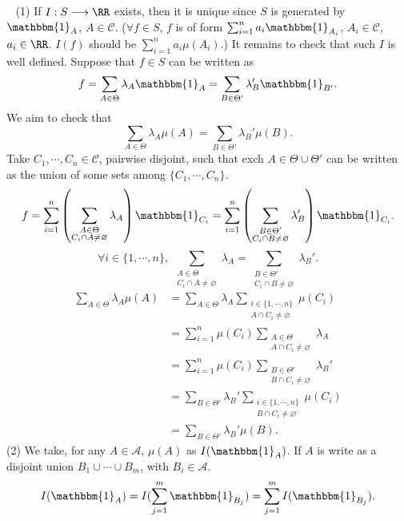 \begin{proofenv}
    \ \newline
    (1) If $I:S\longrightarrow \RR$ exists, then it is unique since $S$ is generated by $\mathbbm{1}_A$, $A\in \mathcal{C}$. ($\forall f\in  S$, $f$ is of form $\sum_{i=1}^{n}a_i\mathbbm{1}_{A_i}$, $A_i\in \mathcal{C}$, $a_i\in \RR$. $I(f)$ should be $\sum_{i=1}^{n}a_i\mu(A_i)$.)
    It remains to check that such $I$ is well defined. Suppose that $f\in S$ can be written as 
    $$ f=\sum_{A\in \Theta}\lambda_A\mathbbm{1}_{A}=\sum_{B\in \Theta'}\lambda_B'\mathbbm{1}_{B'}.$$
    We aim to check that
    $$ \sum_{A\in \Theta}\lambda_A\mu(A)=\sum_{B\in \Theta'}\lambda_B'\mu(B).$$
    Take $C_1,\cdots,C_n\in \mathcal{C}$, pairwise disjoint, such that exch $A\in \Theta \cup\Theta'$ can be written as the union of some sets among $\{C_1,\cdots,C_n\}$.
    $$ f=\sum_{i=1}^{n}\left(\sum_{\substack{A\in \Theta\\ C_i\cap A\neq\varnothing}}\lambda_A\right)\mathbbm{1}_{C_i}=\sum_{i=1}^{n}\left(\sum_{\substack{B\in \Theta'\\ C_i\cap B\neq\varnothing}}\lambda_B'\right)\mathbbm{1}_{C_i}.$$
    $$\forall i\in \{1,\cdots,n\},\ \sum_{\substack{A\in \Theta\\ C_i\cap A\neq \varnothing}}\lambda_A=\sum_{\substack{B\in \Theta'\\C_i\cap B\neq \varnothing}}\lambda_B'.$$
    \begin{align*}
        \sum_{A\in \Theta}\lambda_A \mu(A)&=\sum_{A\in \Theta}\lambda_A\sum_{\substack{i\in\{1,\cdots,n\}\\ A\cap C_i\neq \varnothing}}\mu(C_i)\\
        &=\sum_{i=1}^{n}\mu(C_i)\sum_{\substack{A\in \Theta\\ A\cap C_i\neq \varnothing}}\lambda_A\\
        &=\sum_{i=1}^{n}\mu(C_i)\sum_{\substack{B\in \Theta'\\ B\cap C_i\neq \varnothing}}\lambda_B'\\
        &=\sum_{B\in \Theta'}\lambda_B'\sum_{\substack{i\in\{1,\cdots,n\}\\ B\cap C_i\neq \varnothing}}\mu(C_i)\\
        &=\sum_{B\in \Theta'}\lambda_B'\mu(B).
    \end{align*}
    (2) We take, for any $A\in \mathcal{A}$, $\mu(A)$ as $I(\mathbbm{1}_A)$. If $A$ is write as a disjoint union $B_1\cup\cdots\cup B_m$, with $B_i\in \mathcal{A}$.
    $$ I(\mathbbm{1}_A)=I(\sum_{j=1}^{m}\mathbbm{1}_{B_j})=\sum_{j=1}^{m}I(\mathbbm{1}_{B_j}).$$
    
\end{proofenv}
